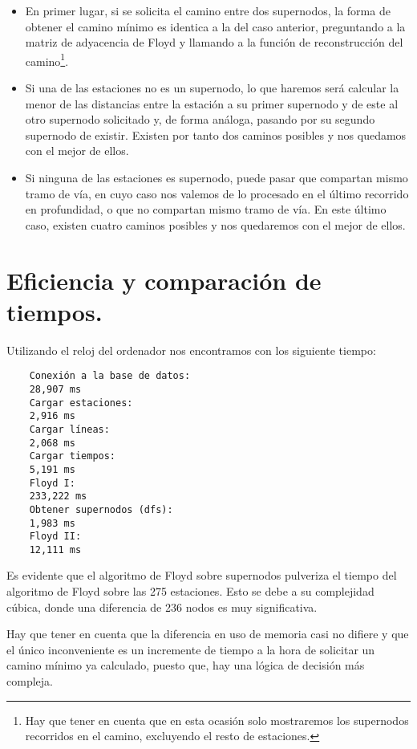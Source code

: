 \documentclass[spanish, a4paper, 12pt] {article}
\begin{document}
\begin{itemize}
\item{
En primer lugar, si se solicita el camino entre dos supernodos, la forma de obtener el camino mínimo es identica a la del caso anterior, preguntando a la matriz de adyacencia de Floyd y llamando a la función de reconstrucción del camino\footnote{Hay que tener en cuenta que en esta ocasión solo mostraremos los supernodos recorridos en el camino, excluyendo el resto de estaciones.}.
}
\item{
Si una de las estaciones no es un supernodo, lo que haremos será calcular la menor de las distancias entre la estación a su primer supernodo y de este al otro supernodo solicitado y, de forma análoga, pasando por su segundo supernodo de existir. Existen por tanto dos caminos posibles y nos quedamos con el mejor de ellos.
}
\item{
Si ninguna de las estaciones es supernodo, puede pasar que compartan mismo tramo de vía, en cuyo caso nos valemos de lo procesado en el último recorrido en profundidad, o que no compartan mismo tramo de vía. En este último caso, existen cuatro caminos posibles y nos quedaremos con el mejor de ellos.
}
\end{itemize}
\section{Eficiencia y comparación de tiempos.}
Utilizando el reloj del ordenador nos encontramos con los siguiente tiempo:
\begin{verbatim}
    Conexión a la base de datos:
    28,907 ms
    Cargar estaciones:
    2,916 ms
    Cargar líneas:
    2,068 ms
    Cargar tiempos:
    5,191 ms
    Floyd I:
    233,222 ms
    Obtener supernodos (dfs):
    1,983 ms
    Floyd II:
    12,111 ms
\end{verbatim}
Es evidente que el algoritmo de Floyd sobre supernodos pulveriza el tiempo del algoritmo de Floyd sobre las 275 estaciones. Esto se debe a su complejidad cúbica, donde una diferencia de 236 nodos es muy significativa.\\ \par
Hay que tener en cuenta que la diferencia en uso de memoria casi no difiere y que el único inconveniente es un incremente de tiempo a la hora de solicitar un camino mínimo ya calculado, puesto que, hay una lógica de decisión más compleja.
\end{document}
